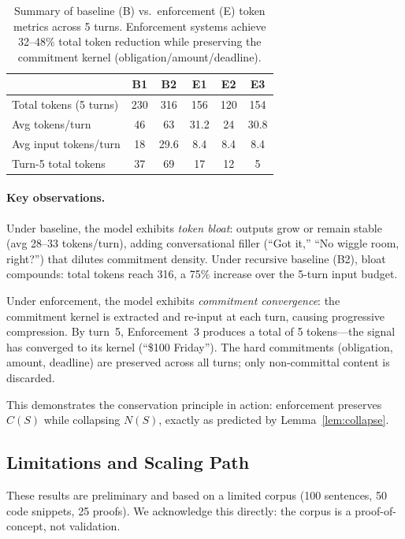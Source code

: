 \documentclass[11pt,a4paper]{article}
\begin{document}
\begin{table}[htbp]
\centering
\begin{tabular}{lccccc}
\toprule
& \textbf{B1} & \textbf{B2} & \textbf{E1} & \textbf{E2} & \textbf{E3} \\
\midrule
Total tokens (5 turns) & 230 & 316 & 156 & 120 & 154 \\
Avg tokens/turn & 46 & 63 & 31.2 & 24 & 30.8 \\
Avg input tokens/turn & 18 & 29.6 & 8.4 & 8.4 & 8.4 \\
Turn-5 total tokens & 37 & 69 & 17 & 12 & 5 \\
\bottomrule
\end{tabular}
\caption{Summary of baseline (B) vs.\ enforcement (E) token metrics across 5 turns. Enforcement systems achieve 32--48\% total token reduction while preserving the commitment kernel (obligation/amount/deadline).}
\label{tab:concrete-results}
\end{table}

\paragraph{Key observations.}
Under baseline, the model exhibits \emph{token bloat}: outputs grow or remain stable (avg 28--33 tokens/turn), adding conversational filler (``Got it,'' ``No wiggle room, right?'') that dilutes commitment density. Under recursive baseline (B2), bloat compounds: total tokens reach 316, a 75\% increase over the 5-turn input budget.

Under enforcement, the model exhibits \emph{commitment convergence}: the commitment kernel is extracted and re-input at each turn, causing progressive compression. By turn~5, Enforcement~3 produces a total of 5 tokens---the signal has converged to its kernel (``\$100 Friday''). The hard commitments (obligation, amount, deadline) are preserved across all turns; only non-committal content is discarded.

This demonstrates the conservation principle in action: enforcement preserves $C(S)$ while collapsing $N(S)$, exactly as predicted by Lemma~\ref{lem:collapse}.

\subsection{Limitations and Scaling Path}

These results are preliminary and based on a limited corpus (100 sentences, 50 code snippets, 25 proofs). We acknowledge this directly: the corpus is a proof-of-concept, not validation.
\end{document}
